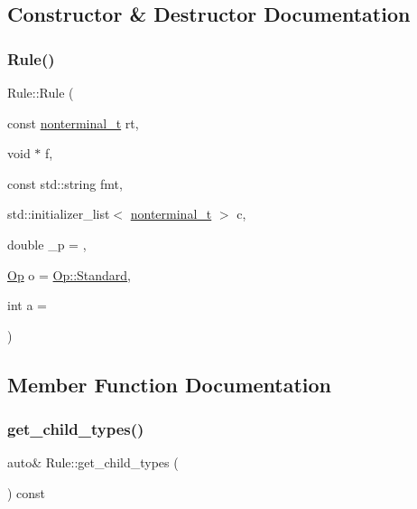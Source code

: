 \subsection{Constructor \& Destructor Documentation}
\mbox{\label{class_rule_a5f4f42aca271d749e2e217188bb481d6}} 
\subsubsection{\texorpdfstring{Rule()}{Rule()}}
{\footnotesize\ttfamily Rule\+::\+Rule (\begin{DoxyParamCaption}\item[{const \hyperlink{_nonterminal_8h_a1c5bfe9b903f69c83bbde5da7035fef3}{nonterminal\+\_\+t}}]{rt,  }\item[{void $\ast$}]{f,  }\item[{const std\+::string}]{fmt,  }\item[{std\+::initializer\+\_\+list$<$ \hyperlink{_nonterminal_8h_a1c5bfe9b903f69c83bbde5da7035fef3}{nonterminal\+\_\+t} $>$}]{c,  }\item[{double}]{\+\_\+p = {},  }\item[{\hyperlink{_ops_8h_a588e6b56097e045c733b60d25c4d45ab}{Op}}]{o = {\ttfamily \hyperlink{_ops_8h_a588e6b56097e045c733b60d25c4d45abaeb6d8ae6f20283755b339c0dc273988b}{Op\+::\+Standard}},  }\item[{int}]{a = {} }\end{DoxyParamCaption})\hspace{0.3cm}{\ttfamily [inline]}}



\subsection{Member Function Documentation}
\mbox{\label{class_rule_a0688b2f904b086d51972abf3c09602c5}} 
\subsubsection{\texorpdfstring{get\+\_\+child\+\_\+types()}{get\_child\_types()}}
{\footnotesize\ttfamily auto\& Rule\+::get\+\_\+child\+\_\+types (\begin{DoxyParamCaption}{ }\end{DoxyParamCaption}) const\hspace{0.3cm}{\ttfamily [inline]}}

